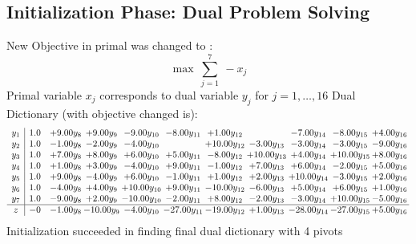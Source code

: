 \documentclass[9pt]{article}
\begin{document}
\subsection{Initialization Phase: Dual Problem Solving}
New Objective in primal was changed to : \[ \max\ \sum_{j=1}^{7}\ - x_j \] 
Primal variable $x_j$ corresponds to dual variable $y_j$ for $j = 1,\ldots,16$
Dual Dictionary (with objective changed is): 
\[\begin{array}{c| c c@{\hskip 2pt} c@{\hskip 2pt} c@{\hskip 2pt} c@{\hskip 2pt} c@{\hskip 2pt} c@{\hskip 2pt} c@{\hskip 2pt} c@{\hskip 2pt} c@{\hskip 2pt} }
 y_{1}   &  1.0 & +  9.00 y_{8} & +  9.00 y_{9} & -9.00 y_{10} & -8.00 y_{11} & +  1.00 y_{12} &   & -7.00 y_{14} & -8.00 y_{15} & +  4.00 y_{16}\\
 y_{2}   &  1.0 & -1.00 y_{8} & -2.00 y_{9} & -4.00 y_{10} &   & + 10.00 y_{12} & -3.00 y_{13} & -3.00 y_{14} & -3.00 y_{15} & -9.00 y_{16}\\
 y_{3}   &  1.0 & +  7.00 y_{8} & +  8.00 y_{9} & +  6.00 y_{10} & +  5.00 y_{11} & -8.00 y_{12} & + 10.00 y_{13} & +  4.00 y_{14} & + 10.00 y_{15} & +  8.00 y_{16}\\
 y_{4}   &  1.0 & +  1.00 y_{8} & +  3.00 y_{9} & -4.00 y_{10} & +  9.00 y_{11} & -1.00 y_{12} & +  7.00 y_{13} & +  6.00 y_{14} & -2.00 y_{15} & +  5.00 y_{16}\\
 y_{5}   &  1.0 & +  9.00 y_{8} & -4.00 y_{9} & +  6.00 y_{10} & -1.00 y_{11} & +  1.00 y_{12} & +  2.00 y_{13} & + 10.00 y_{14} & -3.00 y_{15} & +  2.00 y_{16}\\
 y_{6}   &  1.0 & -4.00 y_{8} & +  4.00 y_{9} & + 10.00 y_{10} & +  9.00 y_{11} & -10.00 y_{12} & -6.00 y_{13} & +  5.00 y_{14} & +  6.00 y_{15} & +  1.00 y_{16}\\
 y_{7}   &  1.0 & -9.00 y_{8} & +  2.00 y_{9} & -10.00 y_{10} & -2.00 y_{11} & +  8.00 y_{12} & -2.00 y_{13} & -3.00 y_{14} & + 10.00 y_{15} & -5.00 y_{16}\\
\hline
z    &  -0 & -1.00 y_{8} & -10.00 y_{9} & -4.00 y_{10} & -27.00 y_{11} & -19.00 y_{12} & +  1.00 y_{13} & -28.00 y_{14} & -27.00 y_{15} & +  5.00 y_{16}\\
\end{array}\]
Initialization succeeded in finding final dual dictionary with 4 pivots
\end{document}
